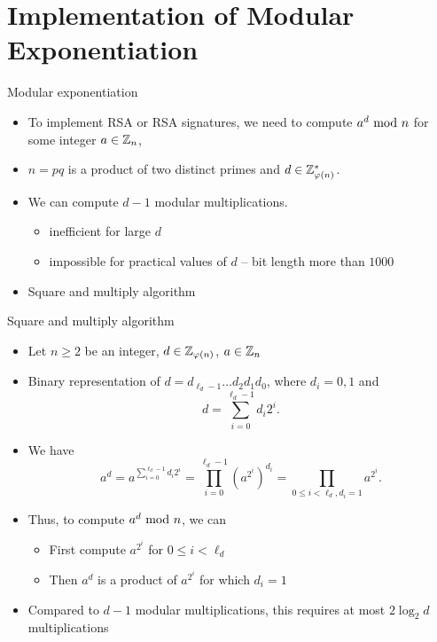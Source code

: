 \section{Implementation of Modular Exponentiation}
\begin{frame}{\VideoName}
    \tableofcontents[currentsection]
\end{frame}

\begin{frame}{Modular exponentiation}
    \begin{itemize}
        \item To implement RSA or RSA signatures, we need to compute $a^d\textrm{~mod~} n$ for some integer $a\in {\mathbb Z}_n$, \item $n=pq$ is a product of two distinct primes and $d\in{\mathbb Z}_{\varphi(n)}^*$.
        \item We can compute $d-1$ modular multiplications.
         \begin{itemize}
             \item inefficient for large $d$
             \item impossible for practical values of $d$ -- bit length more than $1000$
         \end{itemize}
         \item Square and multiply algorithm
    \end{itemize}
\end{frame}

\begin{frame}{Square and multiply algorithm}
    \begin{itemize}
        \item Let $n\geq2$ be an integer, $d\in{\mathbb Z}_{\varphi(n)}$, $a\in{\mathbb Z}_n$
        \item Binary representation of $d=d_{\ell_d-1}\dots d_2d_1d_0$, where $d_i=0,1$ and
\[
d=\sum_{i=0}^{\ell_d-1}d_i2^i.
\]
\item We have
\[
a^d=a^{\sum_{i=0}^{\ell_d-1}d_i2^i}=\prod_{i=0}^{\ell_d-1}(a^{2^i})^{d_i}=\prod_{0\leq i<\ell_d,d_i=1}a^{2^i}.
\]
\item Thus, to compute $a^d\textrm{~mod~} n$, we can 
\begin{itemize}
    \item First compute $a^{2^i}$ for $0\leq i<\ell_d$
    \item Then $a^d$ is a product of $a^{2^i}$ for which $d_i=1$
\end{itemize}
\item Compared to $d-1$ modular multiplications, this requires at most $2\log_2 d$ multiplications
    \end{itemize}
\end{frame}

